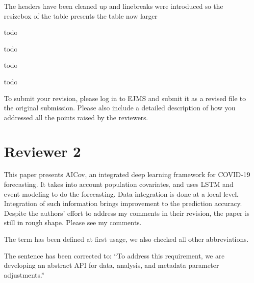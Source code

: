   { The headers have been cleaned up and linebreaks were introduced so
    the resizebox of the table presents the table now larger} 

  { todo}


  { todo}


  { todo}


  
  { todo}



To submit your revision, please log in to EJMS and submit it as a
revised file to the original submission. Please also include a
detailed description of how you addressed all the points raised by the
reviewers.

\section*{Reviewer 2}

This paper presents AICov, an integrated deep learning framework for
COVID-19 forecasting. It takes into account population covariates, and
uses LSTM and event modeling to do the forecasting. Data integration
is done at a local level. Integration of such information brings
improvement to the prediction accuracy. Despite the authors’ effort to
address my comments in their revision, the paper is still in rough
shape. Please see my comments.

\bigskip

  { The term has been defined at first usage, we also checked all
    other abbreviations. }



  {The sentence has been corrected to: ``To address this requirement, we are developing an
  abstract API for data, analysis, and metadata parameter
  adjustments.''}


